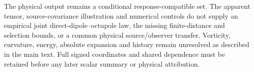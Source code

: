 The physical output remains a conditional response-compatible set. The
apparent tensor, source-covariance illustration and numerical controls
do not supply an empirical joint direct-dipole--octupole law, the
missing finite-distance and selection bounds, or a common physical
source/observer transfer. Vorticity, curvature, energy, absolute
expansion and history remain unresolved as described in the main text.
Full signed coordinates and shared dependence must be retained before
any later scalar summary or physical attribution.
